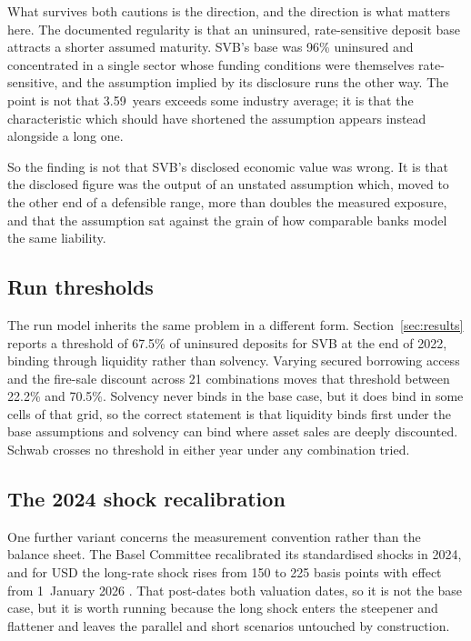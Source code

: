 What survives both cautions is the direction, and the direction is what matters here.
The documented regularity is that an uninsured, rate-sensitive deposit base attracts
a shorter assumed maturity. SVB's base was 96\% uninsured and concentrated in a single
sector whose funding conditions were themselves rate-sensitive, and the assumption
implied by its disclosure runs the other way. The point is not that 3.59~years exceeds
some industry average; it is that the characteristic which should have shortened the
assumption appears instead alongside a long one.

So the finding is not that SVB's disclosed economic value was wrong. It is that the
disclosed figure was the output of an unstated assumption which, moved to the other
end of a defensible range, more than doubles the measured exposure, and that the
assumption sat against the grain of how comparable banks model the same liability.

\subsection{Run thresholds}

The run model inherits the same problem in a different form.
Section~\ref{sec:results} reports a threshold of 67.5\% of uninsured deposits for SVB
at the end of 2022, binding through liquidity rather than solvency. Varying secured
borrowing access and the fire-sale discount across 21 combinations moves that
threshold between 22.2\% and 70.5\%. Solvency never binds in the base case, but it
does bind in some cells of that grid, so the correct statement is that liquidity binds
first under the base assumptions and solvency can bind where asset sales are deeply
discounted. Schwab crosses no threshold in either year under any combination tried.

\subsection{The 2024 shock recalibration}

One further variant concerns the measurement convention rather than the balance sheet.
The Basel Committee recalibrated its standardised shocks in 2024, and for USD the
long-rate shock rises from 150 to 225 basis points with effect from 1~January 2026
\citep{BCBS2024}. That post-dates both valuation dates, so it is not the base case,
but it is worth running because the long shock enters the steepener and flattener and
leaves the parallel and short scenarios untouched by construction.


